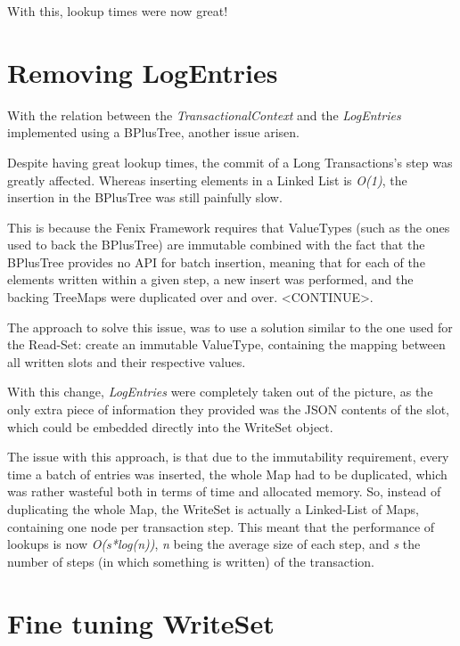 With this, lookup times were now great!

\section{Removing LogEntries}

With the relation between the {\it TransactionalContext} and the {\it
  LogEntries} implemented using a BPlusTree, another issue arisen. 

Despite having great lookup times, the commit of a Long Transactions's
step was greatly affected. Whereas inserting elements in a Linked List
is {\it O(1)}, the insertion in the BPlusTree was still painfully
slow.

This is because the Fenix Framework requires that ValueTypes (such as
the ones used to back the BPlusTree) are immutable combined with the
fact that the BPlusTree provides no API for batch insertion, meaning
that for each of the elements written within a given step, a new
insert was performed, and the backing TreeMaps were duplicated over
and over. <CONTINUE>.

The approach to solve this issue, was to use a solution similar to the
one used for the Read-Set: create an immutable ValueType, containing
the mapping between all written slots and their respective values.

With this change, {\it LogEntries} were completely taken out of the
picture, as the only extra piece of information they provided was the
JSON contents of the slot, which could be embedded directly into the
WriteSet object.

The issue with this approach, is that due to the immutability
requirement, every time a batch of entries was inserted, the whole Map
had to be duplicated, which was rather wasteful both in terms of time
and allocated memory. So, instead of duplicating the whole Map, the
WriteSet is actually a Linked-List of Maps, containing one node per
transaction step. This meant that the performance of lookups is now
{\it O(s*log(n))}, {\it n} being the average size of each step, and
{\it s} the number of steps (in which something is written) of the
transaction.

\section{Fine tuning WriteSet}

